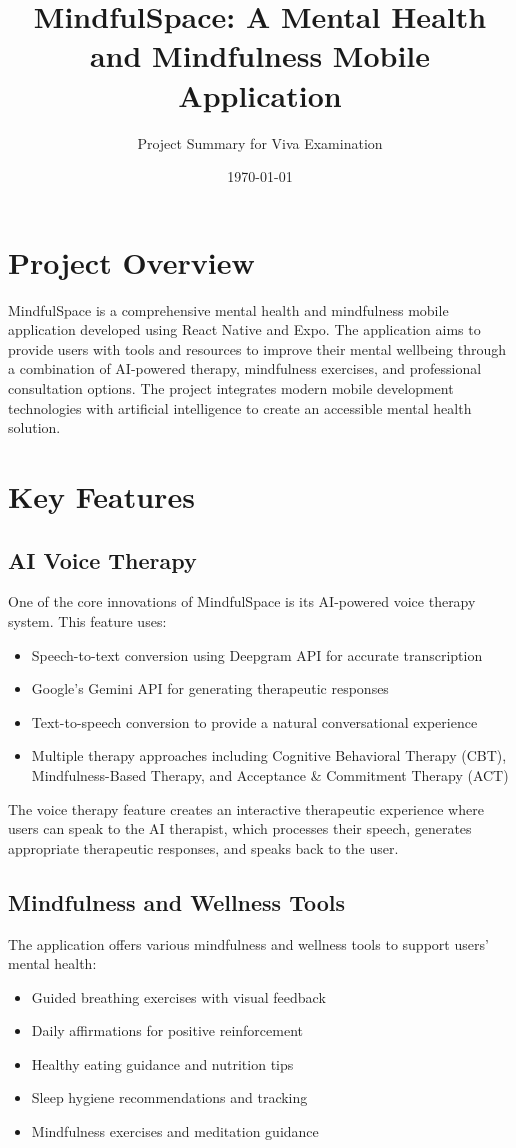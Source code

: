 \documentclass[11pt,a4paper]{article}
\title{\textbf{MindfulSpace: A Mental Health and Mindfulness Mobile Application}}
\author{Project Summary for Viva Examination}
\date{\today}
\begin{document}
\maketitle

\section{Project Overview}
MindfulSpace is a comprehensive mental health and mindfulness mobile application developed using React Native and Expo. The application aims to provide users with tools and resources to improve their mental wellbeing through a combination of AI-powered therapy, mindfulness exercises, and professional consultation options. The project integrates modern mobile development technologies with artificial intelligence to create an accessible mental health solution.

\section{Key Features}

\subsection{AI Voice Therapy}
One of the core innovations of MindfulSpace is its AI-powered voice therapy system. This feature uses:
\begin{itemize}
    \item Speech-to-text conversion using Deepgram API for accurate transcription
    \item Google's Gemini API for generating therapeutic responses
    \item Text-to-speech conversion to provide a natural conversational experience
    \item Multiple therapy approaches including Cognitive Behavioral Therapy (CBT), Mindfulness-Based Therapy, and Acceptance \& Commitment Therapy (ACT)
\end{itemize}

The voice therapy feature creates an interactive therapeutic experience where users can speak to the AI therapist, which processes their speech, generates appropriate therapeutic responses, and speaks back to the user.

\subsection{Mindfulness and Wellness Tools}
The application offers various mindfulness and wellness tools to support users' mental health:
\begin{itemize}
    \item Guided breathing exercises with visual feedback
    \item Daily affirmations for positive reinforcement
    \item Healthy eating guidance and nutrition tips
    \item Sleep hygiene recommendations and tracking
    \item Mindfulness exercises and meditation guidance
\end{itemize}
\end{document}
